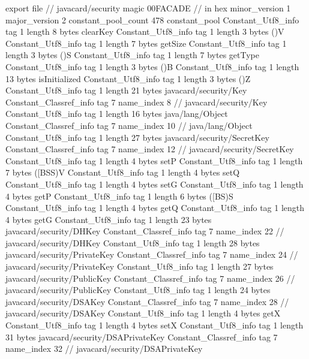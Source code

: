 export file {		// javacard/security
	magic	00FACADE		 // in hex
	minor_version	1
	major_version	2
	constant_pool_count	478
	constant_pool {
		Constant_Utf8_info {
			tag	1
			length	8
			bytes	clearKey
		}
		Constant_Utf8_info {
			tag	1
			length	3
			bytes	()V
		}
		Constant_Utf8_info {
			tag	1
			length	7
			bytes	getSize
		}
		Constant_Utf8_info {
			tag	1
			length	3
			bytes	()S
		}
		Constant_Utf8_info {
			tag	1
			length	7
			bytes	getType
		}
		Constant_Utf8_info {
			tag	1
			length	3
			bytes	()B
		}
		Constant_Utf8_info {
			tag	1
			length	13
			bytes	isInitialized
		}
		Constant_Utf8_info {
			tag	1
			length	3
			bytes	()Z
		}
		Constant_Utf8_info {
			tag	1
			length	21
			bytes	javacard/security/Key
		}
		Constant_Classref_info {
			tag	7
			name_index	8		// javacard/security/Key
		}
		Constant_Utf8_info {
			tag	1
			length	16
			bytes	java/lang/Object
		}
		Constant_Classref_info {
			tag	7
			name_index	10		// java/lang/Object
		}
		Constant_Utf8_info {
			tag	1
			length	27
			bytes	javacard/security/SecretKey
		}
		Constant_Classref_info {
			tag	7
			name_index	12		// javacard/security/SecretKey
		}
		Constant_Utf8_info {
			tag	1
			length	4
			bytes	setP
		}
		Constant_Utf8_info {
			tag	1
			length	7
			bytes	([BSS)V
		}
		Constant_Utf8_info {
			tag	1
			length	4
			bytes	setQ
		}
		Constant_Utf8_info {
			tag	1
			length	4
			bytes	setG
		}
		Constant_Utf8_info {
			tag	1
			length	4
			bytes	getP
		}
		Constant_Utf8_info {
			tag	1
			length	6
			bytes	([BS)S
		}
		Constant_Utf8_info {
			tag	1
			length	4
			bytes	getQ
		}
		Constant_Utf8_info {
			tag	1
			length	4
			bytes	getG
		}
		Constant_Utf8_info {
			tag	1
			length	23
			bytes	javacard/security/DHKey
		}
		Constant_Classref_info {
			tag	7
			name_index	22		// javacard/security/DHKey
		}
		Constant_Utf8_info {
			tag	1
			length	28
			bytes	javacard/security/PrivateKey
		}
		Constant_Classref_info {
			tag	7
			name_index	24		// javacard/security/PrivateKey
		}
		Constant_Utf8_info {
			tag	1
			length	27
			bytes	javacard/security/PublicKey
		}
		Constant_Classref_info {
			tag	7
			name_index	26		// javacard/security/PublicKey
		}
		Constant_Utf8_info {
			tag	1
			length	24
			bytes	javacard/security/DSAKey
		}
		Constant_Classref_info {
			tag	7
			name_index	28		// javacard/security/DSAKey
		}
		Constant_Utf8_info {
			tag	1
			length	4
			bytes	getX
		}
		Constant_Utf8_info {
			tag	1
			length	4
			bytes	setX
		}
		Constant_Utf8_info {
			tag	1
			length	31
			bytes	javacard/security/DSAPrivateKey
		}
		Constant_Classref_info {
			tag	7
			name_index	32		// javacard/security/DSAPrivateKey
}}}
